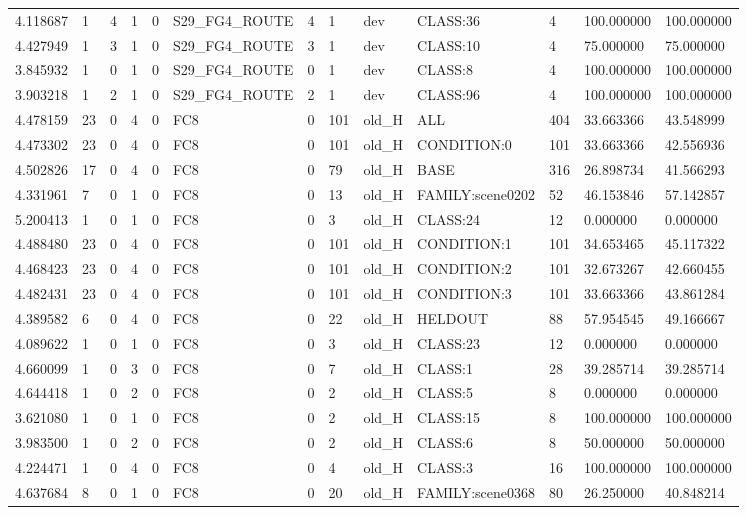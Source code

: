\begin{tabular}{lllllllllllll}
4.118687 & 1 & 4 & 1 & 0 & S29\_FG4\_ROUTE & 4 & 1 & dev & CLASS:36 & 4 & 100.000000 & 100.000000 \\
4.427949 & 1 & 3 & 1 & 0 & S29\_FG4\_ROUTE & 3 & 1 & dev & CLASS:10 & 4 & 75.000000 & 75.000000 \\
3.845932 & 1 & 0 & 1 & 0 & S29\_FG4\_ROUTE & 0 & 1 & dev & CLASS:8 & 4 & 100.000000 & 100.000000 \\
3.903218 & 1 & 2 & 1 & 0 & S29\_FG4\_ROUTE & 2 & 1 & dev & CLASS:96 & 4 & 100.000000 & 100.000000 \\
4.478159 & 23 & 0 & 4 & 0 & FC8 & 0 & 101 & old\_H & ALL & 404 & 33.663366 & 43.548999 \\
4.473302 & 23 & 0 & 4 & 0 & FC8 & 0 & 101 & old\_H & CONDITION:0 & 101 & 33.663366 & 42.556936 \\
4.502826 & 17 & 0 & 4 & 0 & FC8 & 0 & 79 & old\_H & BASE & 316 & 26.898734 & 41.566293 \\
4.331961 & 7 & 0 & 1 & 0 & FC8 & 0 & 13 & old\_H & FAMILY:scene0202 & 52 & 46.153846 & 57.142857 \\
5.200413 & 1 & 0 & 1 & 0 & FC8 & 0 & 3 & old\_H & CLASS:24 & 12 & 0.000000 & 0.000000 \\
4.488480 & 23 & 0 & 4 & 0 & FC8 & 0 & 101 & old\_H & CONDITION:1 & 101 & 34.653465 & 45.117322 \\
4.468423 & 23 & 0 & 4 & 0 & FC8 & 0 & 101 & old\_H & CONDITION:2 & 101 & 32.673267 & 42.660455 \\
4.482431 & 23 & 0 & 4 & 0 & FC8 & 0 & 101 & old\_H & CONDITION:3 & 101 & 33.663366 & 43.861284 \\
4.389582 & 6 & 0 & 4 & 0 & FC8 & 0 & 22 & old\_H & HELDOUT & 88 & 57.954545 & 49.166667 \\
4.089622 & 1 & 0 & 1 & 0 & FC8 & 0 & 3 & old\_H & CLASS:23 & 12 & 0.000000 & 0.000000 \\
4.660099 & 1 & 0 & 3 & 0 & FC8 & 0 & 7 & old\_H & CLASS:1 & 28 & 39.285714 & 39.285714 \\
4.644418 & 1 & 0 & 2 & 0 & FC8 & 0 & 2 & old\_H & CLASS:5 & 8 & 0.000000 & 0.000000 \\
3.621080 & 1 & 0 & 1 & 0 & FC8 & 0 & 2 & old\_H & CLASS:15 & 8 & 100.000000 & 100.000000 \\
3.983500 & 1 & 0 & 2 & 0 & FC8 & 0 & 2 & old\_H & CLASS:6 & 8 & 50.000000 & 50.000000 \\
4.224471 & 1 & 0 & 4 & 0 & FC8 & 0 & 4 & old\_H & CLASS:3 & 16 & 100.000000 & 100.000000 \\
4.637684 & 8 & 0 & 1 & 0 & FC8 & 0 & 20 & old\_H & FAMILY:scene0368 & 80 & 26.250000 & 40.848214 \\

\end{tabular}
